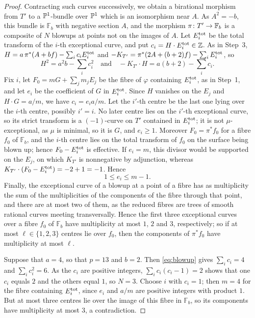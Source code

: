 \begin{proof}
Contracting such curves successively, we obtain a birational morphism from $T'$ to a $\mathbb{P}^1$-bundle over $\mathbb{P}^1$ which is an isomorphism near $A$.
As $A^2 = -b$, this bundle is $\mathbb F_b$ with negative section $A$, and the morphism $\pi\colon T'\to\mathbb F_b$ is a composite of $N$ blowups at points not on the images of $A$.
Let $E_i^{\rm tot}$ be the total transform of the $i$-th exceptional curve, and put $c_i = H\cdot E_i^{\rm tot}\in\mathbb{Z}$.
As in Step~3, $H = a\,\pi^*(A+bf)-\sum_ic_iE_i^{\rm tot}$ and $-K_{T'} = \pi^*(2A+(b+2)f)-\sum_iE_i^{\rm tot}$, so
\begin{equation}\label{eq:blowup}
  H^2 = a^2b-\sum_ic_i^2\quad\text{and}\quad -K_{T'}\cdot H = a(b+2)-\sum_ic_i.
\end{equation}
Fix $i$, let $F_0 = mG+\sum_jm_jE_j$ be the fibre of $\varphi$ containing $E_i^{\rm tot}$, as in Step~1, and let $e_i$ be the coefficient of $G$ in $E_i^{\rm tot}$.
Since $H$ vanishes on the $E_j$ and $H\cdot G = a/m$, we have $c_i = e_ia/m$.
Let the $i'$-th centre be the last one lying over the $i$-th centre, possibly $i' = i$.
No later centre lies on the $i'$-th exceptional curve, so its strict transform is a $(-1)$-curve on $T'$ contained in $E_i^{\rm tot}$; it is not $\mu$-exceptional, as $\mu$ is minimal, so it is $G$, and $e_i\geq 1$.
Moreover $F_0 = \pi^*f_0$ for a fibre $f_0$ of $\mathbb F_b$, and the $i$-th centre lies on the total transform of $f_0$ on the surface being blown up; hence $F_0-E_i^{\rm tot}$ is effective.
If $e_i = m$, this divisor would be supported on the $E_j$, on which $K_{T'}$ is nonnegative by adjunction, whereas $K_{T'}\cdot(F_0-E_i^{\rm tot}) = -2+1 = -1$.
Hence
\[
  1\leq e_i\leq m-1.
\]
Finally, the exceptional curve of a blowup at a point of a fibre has as multiplicity the sum of the multiplicities of the components of the fibre through that point, and there are at most two of them, as the reduced fibres are trees of smooth rational curves meeting transversally.
Hence the first three exceptional curves over a fibre $f_0$ of $\mathbb F_b$ have multiplicity at most $1$, $2$ and $3$, respectively; so if at most $\ell\in\{1,2,3\}$ centres lie over $f_0$, then the components of $\pi^*f_0$ have multiplicity at most $\ell$.

Suppose that $a = 4$, so that $p = 13$ and $b = 2$.
Then \eqref{eq:blowup} gives $\sum_ic_i = 4$ and $\sum_ic_i^2 = 6$.
As the $c_i$ are positive integers, $\sum_ic_i(c_i-1) = 2$ shows that one $c_i$ equals $2$ and the others equal $1$, so $N = 3$.
Choose $i$ with $c_i = 1$; then $m = 4$ for the fibre containing $E_i^{\rm tot}$, since $e_i$ and $a/m$ are positive integers with product $1$.
But at most three centres lie over the image of this fibre in $\mathbb F_b$, so its components have multiplicity at most $3$, a contradiction.


\end{proof}
